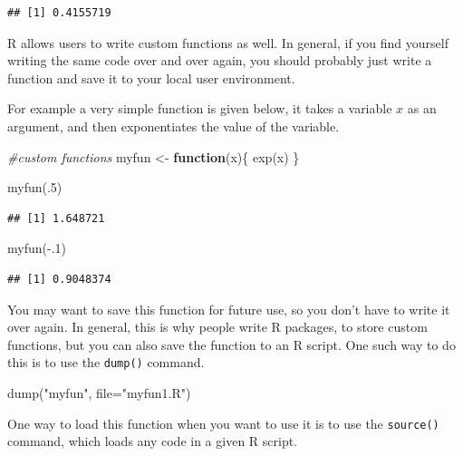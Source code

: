 \documentclass[
]{article}
\newenvironment{Shaded}{\begin{snugshade}}{\end{snugshade}}
\newcommand{\AttributeTok}[1]{\textcolor[rgb]{0.77,0.63,0.00}{#1}}
\newcommand{\CommentTok}[1]{\textcolor[rgb]{0.56,0.35,0.01}{\textit{#1}}}
\newcommand{\ControlFlowTok}[1]{\textcolor[rgb]{0.13,0.29,0.53}{\textbf{#1}}}
\newcommand{\DecValTok}[1]{\textcolor[rgb]{0.00,0.00,0.81}{#1}}
\newcommand{\FunctionTok}[1]{\textcolor[rgb]{0.00,0.00,0.00}{#1}}
\newcommand{\NormalTok}[1]{#1}
\newcommand{\OtherTok}[1]{\textcolor[rgb]{0.56,0.35,0.01}{#1}}
\newcommand{\SpecialCharTok}[1]{\textcolor[rgb]{0.00,0.00,0.00}{#1}}
\newcommand{\StringTok}[1]{\textcolor[rgb]{0.31,0.60,0.02}{#1}}
\begin{document}
\begin{verbatim}
## [1] 0.4155719
\end{verbatim}

R allows users to write custom functions as well. In general, if you
find yourself writing the same code over and over again, you should
probably just write a function and save it to your local user
environment.

For example a very simple function is given below, it takes a variable
\(x\) as an argument, and then exponentiates the value of the variable.

\begin{Shaded}
\begin{Highlighting}[]
\CommentTok{\#custom functions}
\NormalTok{myfun }\OtherTok{\textless{}{-}} \ControlFlowTok{function}\NormalTok{(x)\{}
  \FunctionTok{exp}\NormalTok{(x)}
\NormalTok{\}}

\FunctionTok{myfun}\NormalTok{(.}\DecValTok{5}\NormalTok{)}
\end{Highlighting}
\end{Shaded}

\begin{verbatim}
## [1] 1.648721
\end{verbatim}

\begin{Shaded}
\begin{Highlighting}[]
\FunctionTok{myfun}\NormalTok{(}\SpecialCharTok{{-}}\NormalTok{.}\DecValTok{1}\NormalTok{)}
\end{Highlighting}
\end{Shaded}

\begin{verbatim}
## [1] 0.9048374
\end{verbatim}

You may want to save this function for future use, so you don't have to
write it over again. In general, this is why people write R packages, to
store custom functions, but you can also save the function to an R
script. One such way to do this is to use the \texttt{dump()} command.

\begin{Shaded}
\begin{Highlighting}[]
\FunctionTok{dump}\NormalTok{(}\StringTok{"myfun"}\NormalTok{, }
     \AttributeTok{file=}\StringTok{"myfun1.R"}\NormalTok{)}
\end{Highlighting}
\end{Shaded}

One way to load this function when you want to use it is to use the
\texttt{source()} command, which loads any code in a given R script.
\end{document}
